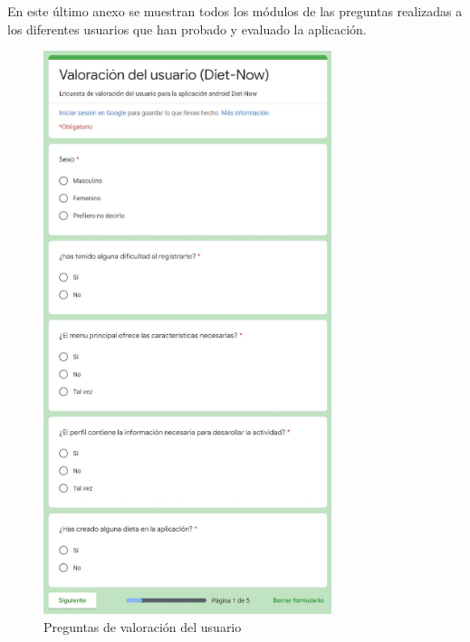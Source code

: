 \setcounter{chapter}{3}
\setcounter{section}{0}
\setcounter{figure}{0}

\noindent
En este último anexo se muestran todos los módulos de las preguntas realizadas a los diferentes usuarios que han probado y evaluado la aplicación.

\begin{figure}[H]
    \centering
    \includegraphics[width=0.75\textwidth]{Images/Capitulo8/Capitulo8.1/val1.png}
    \caption{Preguntas de valoración del usuario}
    \label{fig:preguntas_form_1}
\end{figure}

